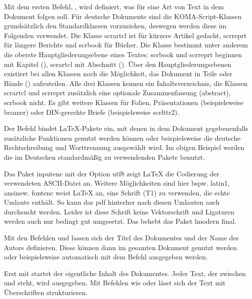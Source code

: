 Mit dem ersten Befehl, , wird definiert, was für eine Art von Text in dem Dokument folgen soll. Für deutsche Dokumente sind die KOMA-Script-Klassen grundsätzlich den Standardklassen vorzuziehen, deswegen werden diese im Folgenden verwendet. Die Klasse scrartcl ist für kürzere Artikel gedacht, scrreprt für längere Berichte und scrbook für Bücher. Die Klasse bestimmt unter anderem die oberste Hauptgliederungsebene eines Textes: scrbook und scrreprt beginnen mit Kapitel (), scrartcl mit Abschnitt (). Über den Hauptgliederungsebenen existiert bei allen Klassen noch die Möglichkeit, das Dokument in Teile oder Bände () aufzuteilen. Alle drei Klassen kennen ein Inhaltsverzeichnis, die Klassen scrartcl und scrreprt zusätzlich eine optionale Zusammenfassung (abstract), scrbook nicht. Es gibt weitere Klassen für Folien, Präsentationen (beispielsweise beamer) oder DIN-gerechte Briefe (beispielsweise scrlttr2).

Der Befehl  bindet LaTeX-Pakete ein, mit denen in dem Dokument gegebenenfalls zusätzliche Funktionen genutzt werden können oder beispielsweise die deutsche Rechtschreibung und Worttrennung ausgewählt wird. Im obigen Beispiel werden die im Deutschen standardmäßig zu verwendenden Pakete benutzt.

Das Paket inputenc mit der Option utf8 zeigt LaTeX die Codierung der verwendeten ASCII-Datei an. Weitere Möglichkeiten sind hier bspw. latin1, ansinew. fontenc weist LaTeX an, eine Schrift (T1) zu verwenden, die echte Umlaute enthält. So kann das pdf hinterher nach diesen Umlauten auch durchsucht werden. Leider ist diese Schrift keine Vektorschrift und Ligaturen werden auch nur bedingt gut umgesetzt. Das behebt das Paket lmodern final.

Mit den Befehlen  und  lassen sich der Titel des Dokumentes und der Name des Autors definieren. Diese können dann im gesamten Dokument genutzt werden oder beispielsweise automatisch mit dem Befehl  ausgegeben werden.

Erst mit  startet der eigentliche Inhalt des Dokumentes. Jeder Text, der zwischen  und  steht, wird ausgegeben. Mit Befehlen wie  oder  lässt sich der Text mit Überschriften strukturieren.